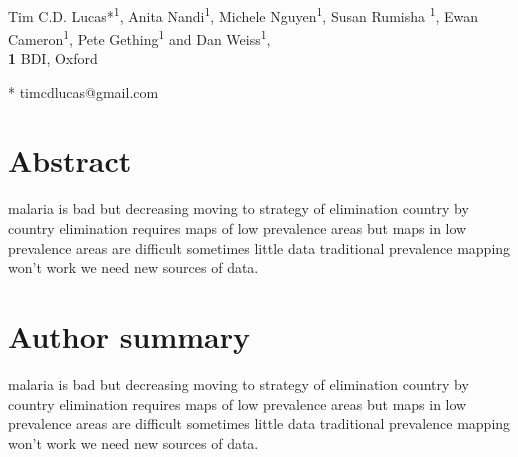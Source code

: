 \documentclass[10pt,letterpaper]{article}
\begin{document}
\vspace*{0.2in}

\begin{flushleft}
{\Large
\textbf{} %
}
\newline
\\
Tim C.D. Lucas*\textsuperscript{1}, Anita Nandi\textsuperscript{1}, Michele Nguyen\textsuperscript{1}, Susan Rumisha \textsuperscript{1}, Ewan Cameron\textsuperscript{1}, Pete Gething\textsuperscript{1} and Dan Weiss\textsuperscript{1},
\\
\bigskip
\textbf{1} BDI, Oxford
\\
\bigskip

% 
%




* timcdlucas@gmail.com

\end{flushleft}
\section*{Abstract}
malaria is bad but decreasing
moving to strategy of elimination country by country
elimination requires maps of low prevalence areas
but maps in low prevalence areas are difficult
sometimes little data
traditional prevalence mapping won't work
we need new sources of data.



\section*{Author summary}
malaria is bad but decreasing
moving to strategy of elimination country by country
elimination requires maps of low prevalence areas
but maps in low prevalence areas are difficult
sometimes little data
traditional prevalence mapping won't work
we need new sources of data.
\end{document}
